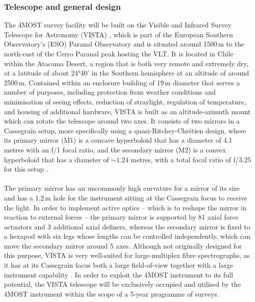 \documentclass[a4paper,11pt]{article}
\begin{document}
\subsubsection{Telescope and general design} \label{telescope_gendes}
The 4MOST survey facility will be built on the Visible and Infrared Survey Telescope for Astronomy (VISTA) \citep{emerson02,emerson06}, which is part of the European Southern Observatory's (ESO) Paranal Observatory and is situated around 1500\,m to the north-east of the Cerro Paranal peak hosting the VLT. It is located in Chile within the Atacama Desert, a region that is both very remote and extremely dry, at a latitude of about 24°40' in the Southern hemisphere at an altitude of around 2500\,m. Contained within an enclosure building of 19\,m diameter that serves a number of purposes, including protection from weather conditions and minimisation of seeing effects, reduction of straylight, regulation of temperature, and housing of additional hardware, VISTA is built as an altitude-azimuth mount which can rotate the telescope around two axes. It consists of two mirrors in a Cassegrain setup, more specifically using a quasi-Ritchey-Chrétien design, where its primary mirror (M1) is a concave hyperboloid that has a diameter of 4.1 metres with an f/1 focal ratio, and the secondary mirror (M2) is a convex hyperboloid that has a diameter of ${\sim}1.24$ metres, with a total focal ratio of f/3.25 for this setup \citep{emerson04}.\\ \\
%
The primary mirror has an uncommonly high curvature for a mirror of its size and has a 1.2\,m hole for the instrument sitting at the Cassegrain focus to receive the light. In order to implement active optics -- which is to reshape the mirror in reaction to external forces -- the primary mirror is supported by 81 axial force actuators and 3 additional axial definers, whereas the secondary mirror is fixed to a hexapod with six legs whose lengths can be controlled independently, which can move the secondary mirror around 5 axes. Although not originally designed for this purpose, VISTA is very well-suited for large-multiplex fibre spectrographs, as it has at its Cassegrain focus both a large field-of-view together with a large instrument capability \citep{sutherland15}. In order to exploit the 4MOST instrument to its full potential, the VISTA telescope will be exclusively occupied and utilised by the 4MOST instrument within the scope of a 5-year programme of surveys.\\ \\
\end{document}
